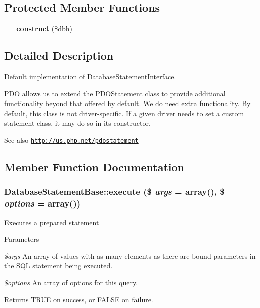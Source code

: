 \subsection*{Protected Member Functions}
\begin{DoxyCompactItemize}
\item 
\hypertarget{classDatabaseStatementBase_afffe31535cb72edb8fb427054e97bd36}{
{\bfseries \_\-\_\-construct} (\$dbh)}
\label{classDatabaseStatementBase_afffe31535cb72edb8fb427054e97bd36}

\end{DoxyCompactItemize}


\subsection{Detailed Description}
Default implementation of \hyperlink{interfaceDatabaseStatementInterface}{DatabaseStatementInterface}.

PDO allows us to extend the PDOStatement class to provide additional functionality beyond that offered by default. We do need extra functionality. By default, this class is not driver-\/specific. If a given driver needs to set a custom statement class, it may do so in its constructor.

\begin{DoxySeeAlso}{See also}
\href{http://us.php.net/pdostatement}{\tt http://us.php.net/pdostatement} 
\end{DoxySeeAlso}


\subsection{Member Function Documentation}
\hypertarget{classDatabaseStatementBase_a21521f5da2bf06d851bfb782c0d21b52}{
\subsubsection[{execute}]{\setlength{\rightskip}{0pt plus 5cm}DatabaseStatementBase::execute (\$ {\em args} = {\ttfamily array()}, \/  \$ {\em options} = {\ttfamily array()})}}
\label{classDatabaseStatementBase_a21521f5da2bf06d851bfb782c0d21b52}
Executes a prepared statement


\begin{DoxyParams}{Parameters}
\item[{\em \$args}]An array of values with as many elements as there are bound parameters in the SQL statement being executed. \item[{\em \$options}]An array of options for this query.\end{DoxyParams}
\begin{DoxyReturn}{Returns}
TRUE on success, or FALSE on failure. 
\end{DoxyReturn}


